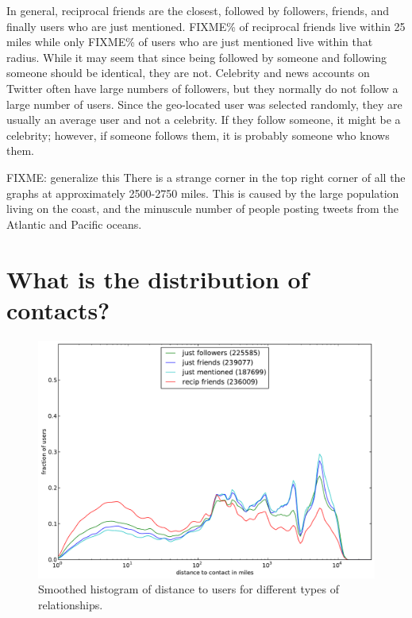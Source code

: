 In general, reciprocal friends are the closest, followed by followers, friends,
and finally users who are just mentioned.
FIXME\% of reciprocal friends live within 25 miles while only FIXME\% of users
who are just mentioned live within that radius.
While it may seem that since being followed by someone and following someone
should be identical, they are not.
Celebrity and news accounts on Twitter often have large numbers of followers,
but they normally do not follow a large number of users.
Since the geo-located user was selected randomly, they are usually an average
user and not a celebrity.
If they follow someone, it might be a celebrity; however, if someone follows
them, it is probably someone who knows them.

FIXME: generalize this
There is a strange corner in the top right corner of all the graphs at
approximately 2500-2750 miles.
This is caused by the large population living on the coast, and the minuscule
number of people posting tweets from the Atlantic and Pacific oceans.

\section{What is the distribution of contacts?}

\begin{figure}[h]
\centering
\includegraphics[width=\linewidth]{figures/edge_types_norm.pdf}
\caption{
Smoothed histogram of distance to users for different types of relationships.
}
\label{fig:EdgeTypes}
\end{figure}

